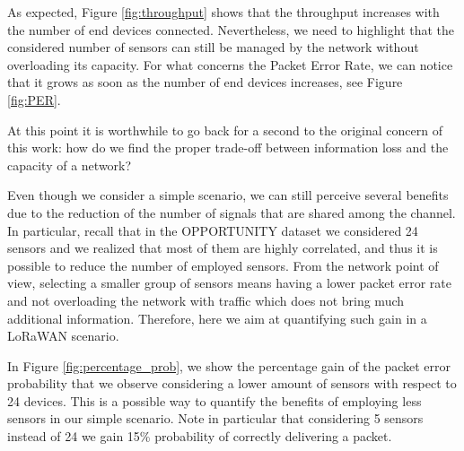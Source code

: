 \documentclass[10pt, a4paper, twocolumn]{article}
\theoremstyle{definition}
\begin{document}
As expected, Figure \ref{fig:throughput} shows that the throughput increases with the number of end devices connected. Nevertheless, we need to highlight that the considered number of sensors can still be managed by the network without overloading its capacity. For what concerns the Packet Error Rate, we can notice that it grows as soon as the number of end devices increases, see Figure \ref{fig:PER}.

At this point it is worthwhile to go back for a second to the original concern of this work: how do we find the proper trade-off between information loss and the capacity of a network?

Even though we consider a simple scenario, we can still perceive several benefits due to the reduction of the number of signals that are shared among the channel. In particular, recall that in the OPPORTUNITY dataset we considered 24 sensors and we realized that most of them are highly correlated, and thus it is possible to reduce the number of employed sensors. From the network point of view, selecting a smaller group of sensors means having a lower packet error rate and not overloading the network with traffic which does not bring much additional information. Therefore, here we aim at quantifying such gain in a LoRaWAN scenario.


In Figure \ref{fig:percentage_prob}, we show the percentage gain of the packet error probability that we observe considering a lower amount of sensors with respect to 24 devices. This is a possible way to quantify the benefits of employing less sensors in our simple scenario. Note in particular that considering 5 sensors instead of 24 we gain 15\% probability of correctly delivering a packet.
\end{document}
